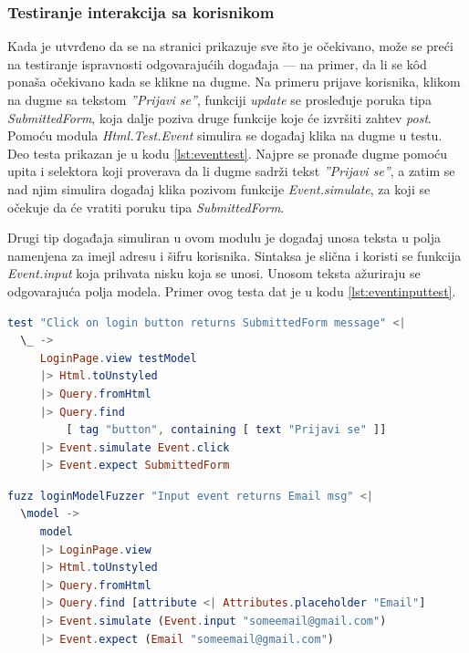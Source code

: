 \documentclass[12pt,oneside]{memoir}
\begin{document}
\subsubsection{Testiranje interakcija sa korisnikom}

\par Kada je utvrđeno da se na stranici prikazuje sve što je očekivano, može se preći na testiranje ispravnosti odgovarajućih događaja --- na primer, da li se k\^{o}d ponaša očekivano kada se klikne na dugme. Na primeru prijave korisnika, klikom na dugme sa tekstom \emph{''Prijavi se''}, funkciji \emph{update} se prosleđuje poruka tipa \emph{SubmittedForm}, koja dalje poziva druge funkcije koje će izvršiti zahtev \emph{post}. Pomoću modula \emph{Html.Test.Event} simulira se događaj klika na dugme u testu. Deo testa prikazan je u kodu \ref{lst:eventtest}. Najpre se pronađe dugme pomoću upita i selektora koji proverava da li dugme sadrži tekst \emph{''Prijavi se''}, a zatim se nad njim simulira događaj klika pozivom funkcije \emph{Event.simulate}, za koji se očekuje da će vratiti poruku tipa \emph{SubmittedForm}. 
\par Drugi tip događaja simuliran u ovom modulu je događaj unosa teksta u polja namenjena za imejl adresu i šifru korisnika. Sintaksa je slična i koristi se funkcija \emph{Event.input} koja prihvata nisku koja se unosi. Unosom teksta ažuriraju se odgovarajuća polja modela. Primer ovog testa dat je u kodu \ref{lst:eventinputtest}. 

\begin{minipage}{\linewidth}
\begin{lstlisting}[language=elm, basicstyle=\small, caption={Simulacija događaja klika na dugme u testu funkcije \emph{view} modula \emph{LoginPage}},captionpos=b, label={lst:eventtest}]
test "Click on login button returns SubmittedForm message" <|
  \_ -> 
     LoginPage.view testModel
     |> Html.toUnstyled
     |> Query.fromHtml
     |> Query.find
         [ tag "button", containing [ text "Prijavi se" ]]
     |> Event.simulate Event.click
     |> Event.expect SubmittedForm
\end{lstlisting}
\end{minipage}

\vspace*{1\baselineskip}

\begin{minipage}{\linewidth}
\begin{lstlisting}[language=elm, basicstyle=\small, caption={Simulacija događaja unosa teksta u testu funkcije \emph{view} modula \emph{LoginPage}},captionpos=b, label={lst:eventinputtest}]
fuzz loginModelFuzzer "Input event returns Email msg" <|
  \model ->
     model
     |> LoginPage.view 
     |> Html.toUnstyled
     |> Query.fromHtml
     |> Query.find [attribute <| Attributes.placeholder "Email"]
     |> Event.simulate (Event.input "someemail@gmail.com")
     |> Event.expect (Email "someemail@gmail.com")
\end{lstlisting}
\end{minipage}
\end{document}
